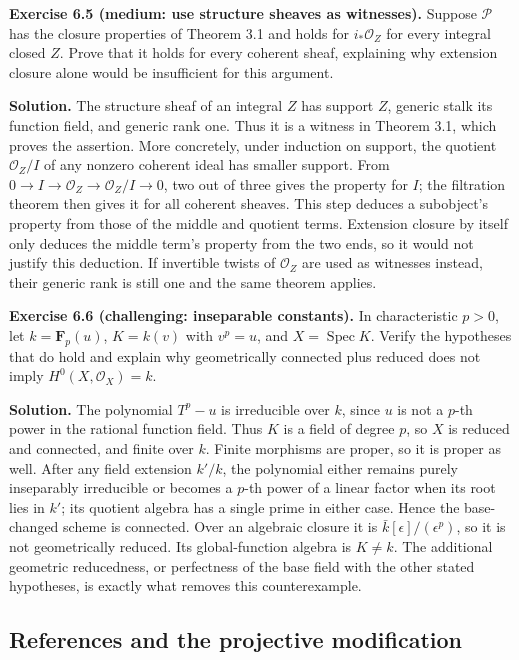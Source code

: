 \documentclass[11pt]{article}
\begin{document}
\textbf{Exercise 6.5 (medium: use structure sheaves as witnesses).}
Suppose \(\mathcal P\) has the closure properties of Theorem 3.1 and
holds for \(i_*\mathcal O_Z\) for every integral closed \(Z\). Prove
that it holds for every coherent sheaf, explaining why extension closure
alone would be insufficient for this argument.

\textbf{Solution.} The structure sheaf of an integral \(Z\) has support
\(Z\), generic stalk its function field, and generic rank one. Thus it
is a witness in Theorem 3.1, which proves the assertion. More
concretely, under induction on support, the quotient \(\mathcal O_Z/I\)
of any nonzero coherent ideal has smaller support. From
\(0\to I\to\mathcal O_Z\to\mathcal O_Z/I\to0\), two out of three gives
the property for \(I\); the filtration theorem then gives it for all
coherent sheaves. This step deduces a subobject's property from those of
the middle and quotient terms. Extension closure by itself only deduces
the middle term's property from the two ends, so it would not justify
this deduction. If invertible twists of \(\mathcal O_Z\) are used as
witnesses instead, their generic rank is still one and the same theorem
applies.

\textbf{Exercise 6.6 (challenging: inseparable constants).} In
characteristic \(p>0\), let \(k=\mathbf F_p(u)\), \(K=k(v)\) with
\(v^p=u\), and \(X=\operatorname{Spec}K\). Verify the hypotheses that do
hold and explain why geometrically connected plus reduced does not imply
\(H^0(X,\mathcal O_X)=k\).

\textbf{Solution.} The polynomial \(T^p-u\) is irreducible over \(k\),
since \(u\) is not a \(p\)-th power in the rational function field. Thus
\(K\) is a field of degree \(p\), so \(X\) is reduced and connected, and
finite over \(k\). Finite morphisms are proper, so it is proper as well.
After any field extension \(k'/k\), the polynomial either remains purely
inseparably irreducible or becomes a \(p\)-th power of a linear factor
when its root lies in \(k'\); its quotient algebra has a single prime in
either case. Hence the base-changed scheme is connected. Over an
algebraic closure it is \(\bar k[\epsilon]/(\epsilon^p)\), so it is not
geometrically reduced. Its global-function algebra is \(K\ne k\). The
additional geometric reducedness, or perfectness of the base field with
the other stated hypotheses, is exactly what removes this
counterexample.

\subsection{References and the projective
modification}\label{references-and-the-projective-modification}
\end{document}
